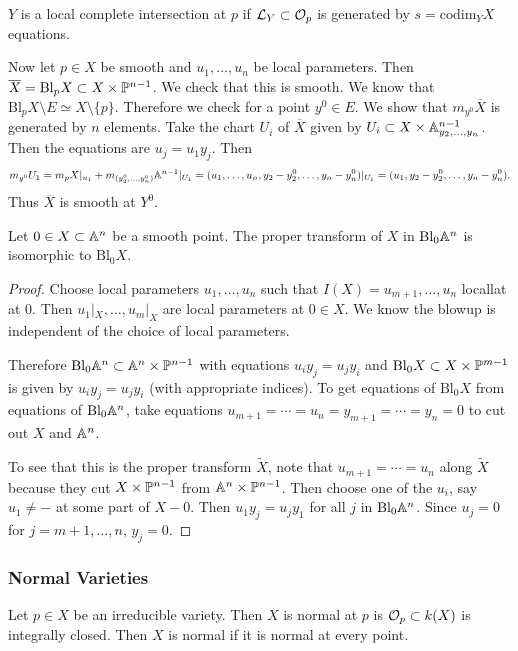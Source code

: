 \documentclass[twoside, 10pt]{article}
\begin{document}
    \begin{rmk}
        $Y$ is a local complete intersection at $p$ if $\mc{L}_Y \subset \mc{O}_p$ is generated by $s= \mathrm{codim}_Y X$ equations.
    \end{rmk}

    Now let $p \in X$ be smooth and $u_1, \ldots, u_n$ be local parameters. Then $\overline{X} = \mathrm{Bl}_p X \subset X \times \P^{n-1}$. We check that this is smooth. We know that $\mathrm{Bl}_p X \setminus E \simeq X \setminus \{p\}$. Therefore we check for a point $y^0 \in E$. We show that $m_{y^0} \overline{X}$ is generated by $n$ elements. Take the chart $U_i$ of $\overline{X}$ given by $U_i \subset X \times \A^{n-1}_{y_2, \ldots, y_n}$. Then the equations are $u_j=u_1y_j$. Then \[m_{y^0} U_1 = m_p X|_{u_1} + m_{(y_2^0, \ldots, y_n^0)} \A^{n-1}|_{U_1} = (u_1, \ldots, u_n, y_2-y_2^0, \ldots, y_n-y_n^0)|_{U_1} = (u_1, y_2-y_2^0, \ldots, y_n-y_n^0).\] Thus $\overline{X}$ is smooth at $Y^0$.

    \begin{thm}
        Let $0 \in X \subset \A^n$ be a smooth point. The proper transform of $X$ in $\mathrm{Bl}_0 \A^n$ is isomorphic to $\mathrm{Bl}_0 X$.
        \begin{proof}
            Choose local parameters $u_1, \ldots, u_n$ such that $I(X) = u_{m+1}, \ldots, u_n$ locallat at $0$. Then $u_1|_X, \ldots, u_m|_X$ are local parameters at $0 \in X$. We know the blowup is independent of the choice of local parameters.

            Therefore $\mathrm{Bl}_0 \A^n \subset \A^n \times \P^{n-1}$ with equations $u_iy_j = u_jy_i$ and $\mathrm{Bl}_0 X \subset X \times \P^{m-1}$ is given by $u_iy_j = u_jy_i$ (with appropriate indices). To get equations of $\mathrm{Bl}_0 X$ from equations of $\mathrm{Bl}_0 \A^n$, take equations $u_{m+1} = \cdots = u_n = y_{m+1} = \cdots = y_n = 0$ to cut out $X$ and $\A^n$.

            To see that this is the proper transform $\widetilde{X}$, note that $u_{m+1} = \cdots = u_n$ along $\widetilde{X}$ because they cut $X \times \P^{n-1}$ from $\A^n \times \P^{n-1}$. Then choose one of the $u_i$, say $u_1 \neq -$ at some part of $X - 0$. Then $u_1y_j=u_jy_1$ for all $j$ in $\mathrm{Bl}_0 \A^n$. Since $u_j=0$ for $j=m+1, \ldots, n$, $y_j = 0$.
        \end{proof}
    \end{thm}
    
    \subsubsection{Normal Varieties}
    Let $p \in X$ be an irreducible variety. Then $X$ is normal at $p$ is $\mc{O}_p \subset k(X)$ is integrally closed. Then $X$ is normal if it is normal at every point.
\end{document}
